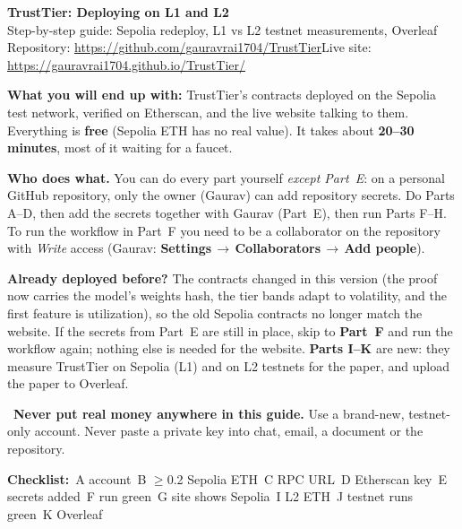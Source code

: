 \documentclass[11pt,a4paper]{article}
\newcommand{\ui}[1]{\textsf{\textbf{#1}}}
\newcommand{\arr}{\,$\rightarrow$\,}
\begin{document}
{\color{accent}\Huge\bfseries TrustTier: Deploying on L1 and L2}\\[4pt]
{\large Step-by-step guide: Sepolia redeploy, L1 vs L2 testnet measurements, Overleaf}\\[2pt]
{\small Repository: \url{https://github.com/gauravrai1704/TrustTier}\quad Live site: \url{https://gauravrai1704.github.io/TrustTier/}}

\vspace{6pt}
\begin{tipbox}
\textbf{What you will end up with:} TrustTier's contracts deployed on the Sepolia test network, verified on Etherscan, and the live website talking to them. Everything is \textbf{free} (Sepolia ETH has no real value). It takes about \textbf{20--30 minutes}, most of it waiting for a faucet.

\textbf{Who does what.} You can do every part yourself \emph{except Part~E}: on a personal GitHub repository, only the owner (Gaurav) can add repository secrets. Do Parts A--D, then add the secrets together with Gaurav (Part~E), then run Parts F--H. To run the workflow in Part~F you need to be a collaborator on the repository with \emph{Write} access (Gaurav: \ui{Settings}\arr\ui{Collaborators}\arr\ui{Add people}).
\end{tipbox}

\begin{tipbox}
\textbf{Already deployed before?} The contracts changed in this version (the proof now carries the model's weights hash, the tier bands adapt to volatility, and the first feature is utilization), so the old Sepolia contracts no longer match the website. If the secrets from Part~E are still in place, skip to \textbf{Part~F} and run the workflow again; nothing else is needed for the website. \textbf{Parts I--K} are new: they measure TrustTier on Sepolia (L1) and on L2 testnets for the paper, and upload the paper to Overleaf.
\end{tipbox}

\begin{warnbox}
\faExclamationTriangle\ \textbf{Never put real money anywhere in this guide.} Use a brand-new, testnet-only account. Never paste a private key into chat, email, a document or the repository.
\end{warnbox}

{\small\textbf{Checklist:}\quad \faSquare[regular]\ A account\quad \faSquare[regular]\ B $\geq$0.2 Sepolia ETH\quad \faSquare[regular]\ C RPC URL\quad \faSquare[regular]\ D Etherscan key\quad \faSquare[regular]\ E secrets added\quad \faSquare[regular]\ F run green\quad \faSquare[regular]\ G site shows Sepolia\quad \faSquare[regular]\ I L2 ETH\quad \faSquare[regular]\ J testnet runs green\quad \faSquare[regular]\ K Overleaf}
\end{document}
